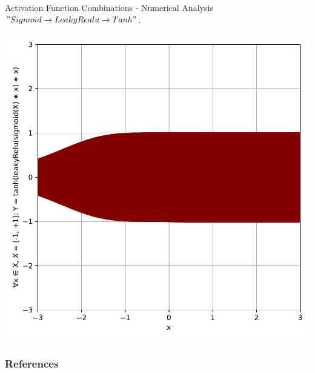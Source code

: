 \documentclass{beamer}
\begin{document}
		\begin{frame}{Activation Function Combinations - Numerical Analysis}
			$" Sigmoid \rightarrow LeakyRealu \rightarrow Tanh "$.
			\begin{center}
				\includegraphics[height=0.9\textheight]{sigmoid_leakyRelu_tanh}
			\end{center}
		\end{frame}
		\begin{frame}
			\frametitle{References}
			
			
		\end{frame}
\end{document}
